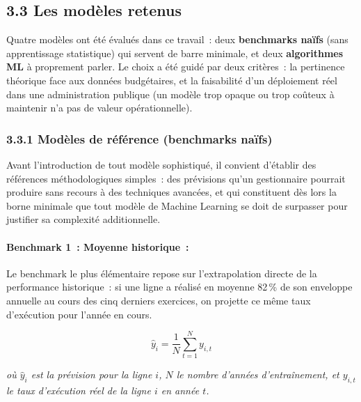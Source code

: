 \subsection*{3.3 \quad Les modèles retenus}

Quatre modèles ont été évalués dans ce travail~: deux \textbf{benchmarks naïfs}
(sans apprentissage statistique) qui servent de barre minimale, et deux
\textbf{algorithmes ML} à proprement parler. Le choix a été guidé par deux critères~:
la pertinence théorique face aux données budgétaires, et la faisabilité d'un
déploiement réel dans une administration publique (un modèle trop opaque ou trop
coûteux à maintenir n'a pas de valeur opérationnelle).

\subsubsection*{3.3.1 \quad Modèles de référence (benchmarks naïfs)}

Avant l'introduction de tout modèle sophistiqué, il convient d'établir des références
méthodologiques simples~: des prévisions qu'un gestionnaire pourrait produire sans recours
à des techniques avancées, et qui constituent dès lors la borne minimale que tout modèle
de Machine Learning se doit de surpasser pour justifier sa complexité additionnelle.

\paragraph{Benchmark 1~: Moyenne historique~:}

Le benchmark le plus élémentaire repose sur l'extrapolation directe de la performance
historique~: si une ligne a réalisé en moyenne 82\,\% de son enveloppe annuelle au cours
des cinq derniers exercices, on projette ce même taux d'exécution pour l'année en cours.

$$\hat{y}_i = \frac{1}{N} \sum_{t=1}^{N} y_{i,t}$$

\noindent\small\textit{où $\hat{y}_i$ est la prévision pour la ligne $i$, $N$ le nombre d'années d'entraînement, et $y_{i,t}$ le taux d'exécution réel de la ligne $i$ en année $t$.}\normalsize

